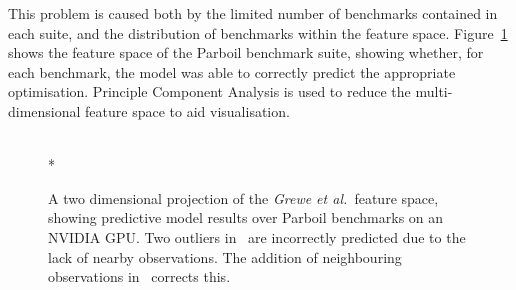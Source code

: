 \begin{table}
	\centering
	
  \caption[Cross-validation of benchmark suites on a predictive model]{%
    Performance relative to the optimal of the \emph{Grewe et al.\ }predictive model across different benchmark suites on an AMD GPU. The columns show the suite used for training; the rows show the suite used for testing.%
  }
  \label{tab:cpu-gpu-benchmarks-crossvalidate}
\end{table}

This problem is caused both by the limited number of benchmarks contained in each suite, and the distribution of benchmarks within the feature space. Figure~\ref{fig:pca-benchmarks} shows the feature space of the Parboil benchmark suite, showing whether, for each benchmark, the model was able to correctly predict the appropriate optimisation. Principle Component Analysis is used to reduce the multi-dimensional feature space to aid visualisation.

\begin{figure}
	\centering
  \\*
	\caption[Identifying and correcting outliers in a benchmark suite]{%
    A two dimensional projection of the \emph{Grewe et al.\ }feature space, showing predictive model results over Parboil benchmarks on an NVIDIA GPU. Two outliers in~\protect{} are incorrectly predicted due to the lack of nearby observations. The addition of neighbouring observations in~\protect{} corrects this.%
  }%
	\label{fig:pca-benchmarks}
\end{figure}


